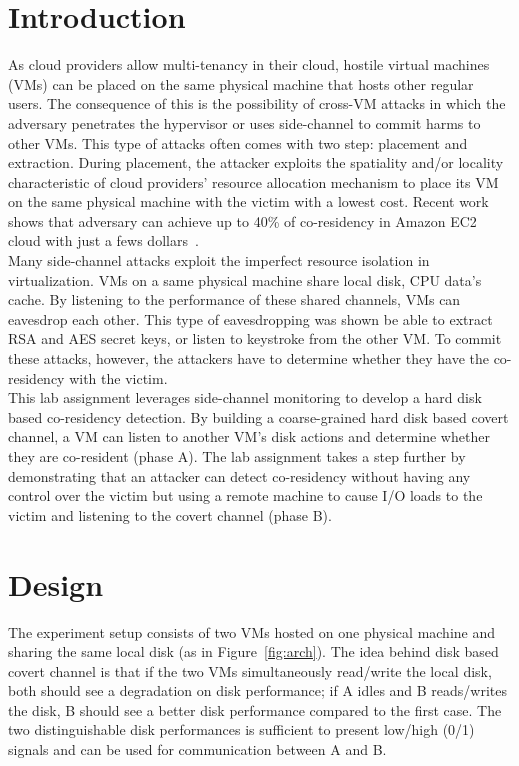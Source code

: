 \section{Introduction}
As cloud providers allow multi-tenancy in their cloud, 
hostile virtual machines (VMs) can be placed on the same physical machine that 
hosts other regular users. The consequence of this is the 
possibility of cross-VM attacks in which the adversary 
penetrates the hypervisor or uses side-channel to commit 
harms to other VMs. This type of attacks often comes with 
two step: placement and extraction. During placement, 
the attacker exploits the spatiality and/or locality characteristic of 
cloud providers' resource allocation mechanism to place its VM on the 
same physical machine with the victim with a lowest cost. 
Recent work shows that adversary can achieve 
up to 40\% of co-residency in Amazon EC2 cloud with 
just a fews dollars~\cite{ristenpart2009hey}.\\

Many side-channel attacks exploit 
the imperfect resource isolation in virtualization. VMs on a 
same physical machine share local disk, CPU data's cache. 
By listening to the performance of these shared channels, 
VMs can eavesdrop each other. This type of eavesdropping was shown 
be able to extract RSA and AES secret keys, or listen 
to keystroke from the other VM. To commit these attacks, however, 
the attackers have to determine whether they have the 
co-residency with the victim.\\

This lab assignment leverages side-channel monitoring to develop a hard disk based 
co-residency detection. By building a coarse-grained hard disk based covert 
channel, a VM can listen to another VM's disk actions and determine whether they 
are co-resident (phase A). The lab assignment takes a step further by demonstrating that 
an attacker can detect co-residency without having any 
control over the victim but using a remote machine to cause I/O loads 
to the victim and listening to the covert channel (phase B).\\

\section{Design}
The experiment setup consists of two VMs hosted on one physical 
machine and sharing the same local disk (as in Figure~\ref{fig:arch}). The idea behind 
disk based covert channel is that if the two VMs 
simultaneously read/write the local disk, both should see 
a degradation on disk performance; if A idles and B reads/writes 
the disk, B should see a better disk performance compared to the first case. 
The two distinguishable disk performances is sufficient to 
present low/high (0/1) signals and can be used for communication between A and 
B.\\

